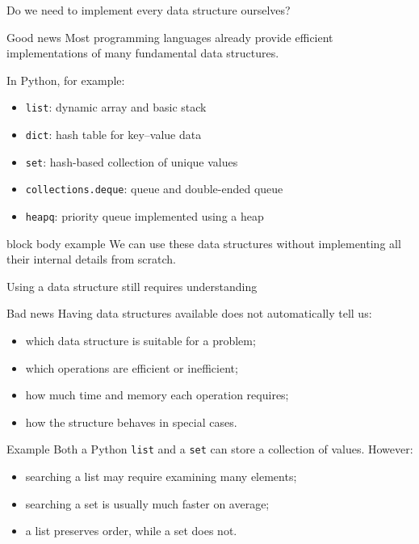 \documentclass[aspectratio=169]{beamer}
\begin{document}
\begin{frame}{Do we need to implement every data structure ourselves?}
  \small

  \begin{exampleblock}{Good news}
    Most programming languages already provide efficient implementations of many fundamental data structures.

    \vspace{0.35cm}

    In Python, for example:
    \begin{itemize}
      \item \texttt{list}: dynamic array and basic stack
      \item \texttt{dict}: hash table for key--value data
      \item \texttt{set}: hash-based collection of unique values
      \item \texttt{collections.deque}: queue and double-ended queue
      \item \texttt{heapq}: priority queue implemented using a heap
    \end{itemize}
  \end{exampleblock}

  \begin{beamercolorbox}[
      wd=\textwidth,
      sep=0.7em,
      center,
      rounded=true
    ]{block body example}
    We can use these data structures without implementing all their internal details from scratch.
  \end{beamercolorbox}
\end{frame}

\begin{frame}{Using a data structure still requires understanding}
  \small

  \begin{alertblock}{Bad news}
    Having data structures available does not automatically tell us:
    \begin{itemize}
      \item which data structure is suitable for a problem;
      \item which operations are efficient or inefficient;
      \item how much time and memory each operation requires;
      \item how the structure behaves in special cases.
    \end{itemize}
  \end{alertblock}

  \begin{block}{Example}
    Both a Python \texttt{list} and a \texttt{set} can store a collection of values. However:
    \begin{itemize}
      \item searching a list may require examining many elements;
      \item searching a set is usually much faster on average;
      \item a list preserves order, while a set does not.
    \end{itemize}
  \end{block}
\end{frame}
\end{document}
